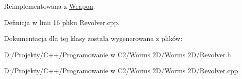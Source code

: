 Reimplementowana z \mbox{\hyperlink{class_weapon_aaf32c85f3e70d3c8392c928b9e6e75ca}{Weapon}}.



Definicja w linii 16 pliku Revolver.\+cpp.



Dokumentacja dla tej klasy została wygenerowana z plików\+:\begin{DoxyCompactItemize}
\item 
D\+:/\+Projekty/\+C++/\+Programowanie w C2/\+Worms 2\+D/\+Worms 2\+D/\mbox{\hyperlink{_revolver_8h}{Revolver.\+h}}\item 
D\+:/\+Projekty/\+C++/\+Programowanie w C2/\+Worms 2\+D/\+Worms 2\+D/\mbox{\hyperlink{_revolver_8cpp}{Revolver.\+cpp}}\end{DoxyCompactItemize}
